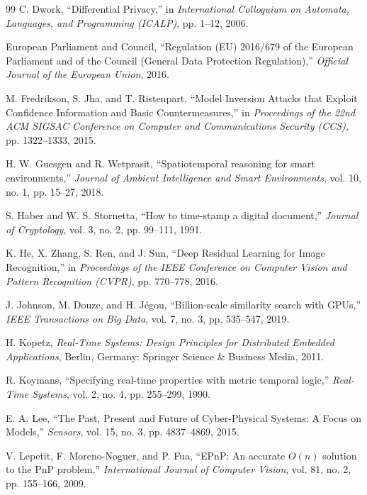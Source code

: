 \documentclass[12pt,a4paper,oneside]{report}
\begin{document}
\begin{thebibliography}{99}
C. Dwork, ``Differential Privacy,'' in \textit{International Colloquium on Automata, Languages, and Programming (ICALP)}, pp. 1--12, 2006.

European Parliament and Council, ``Regulation (EU) 2016/679 of the European Parliament and of the Council (General Data Protection Regulation),'' \textit{Official Journal of the European Union}, 2016.

M. Fredrikson, S. Jha, and T. Ristenpart, ``Model Inversion Attacks that Exploit Confidence Information and Basic Countermeasures,'' in \textit{Proceedings of the 22nd ACM SIGSAC Conference on Computer and Communications Security (CCS)}, pp. 1322--1333, 2015.

H. W. Guesgen and R. Wetprasit, ``Spatiotemporal reasoning for smart environments,'' \textit{Journal of Ambient Intelligence and Smart Environments}, vol. 10, no. 1, pp. 15--27, 2018.

S. Haber and W. S. Stornetta, ``How to time-stamp a digital document,'' \textit{Journal of Cryptology}, vol. 3, no. 2, pp. 99--111, 1991.

K. He, X. Zhang, S. Ren, and J. Sun, ``Deep Residual Learning for Image Recognition,'' in \textit{Proceedings of the IEEE Conference on Computer Vision and Pattern Recognition (CVPR)}, pp. 770--778, 2016.

J. Johnson, M. Douze, and H. Jégou, ``Billion-scale similarity search with GPUs,'' \textit{IEEE Transactions on Big Data}, vol. 7, no. 3, pp. 535--547, 2019.

H. Kopetz, \textit{Real-Time Systems: Design Principles for Distributed Embedded Applications}, Berlin, Germany: Springer Science \& Business Media, 2011.

R. Koymans, ``Specifying real-time properties with metric temporal logic,'' \textit{Real-Time Systems}, vol. 2, no. 4, pp. 255--299, 1990.

E. A. Lee, ``The Past, Present and Future of Cyber-Physical Systems: A Focus on Models,'' \textit{Sensors}, vol. 15, no. 3, pp. 4837--4869, 2015.

V. Lepetit, F. Moreno-Noguer, and P. Fua, ``EPnP: An accurate $O(n)$ solution to the PnP problem,'' \textit{International Journal of Computer Vision}, vol. 81, no. 2, pp. 155--166, 2009.


\end{thebibliography}
\end{document}
